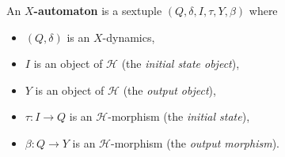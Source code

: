 An \textbf{$X$-automaton} is a sextuple $(Q, \delta, I, \tau, Y, \beta)$ where
\begin{itemize}
\item $(Q, \delta)$ is an $X$-dynamics,
\item $I$ is an object of $\mathcal{H}$ (the \textit{initial state object}),
\item $Y$ is an object of $\mathcal{H}$ (the \textit{output object}),
\item $\tau: I \to Q$ is an $\mathcal{H}$-morphism (the \textit{initial state}),
\item $\beta: Q \to Y$ is an $\mathcal{H}$-morphism (the \textit{output morphism}).
\end{itemize}
